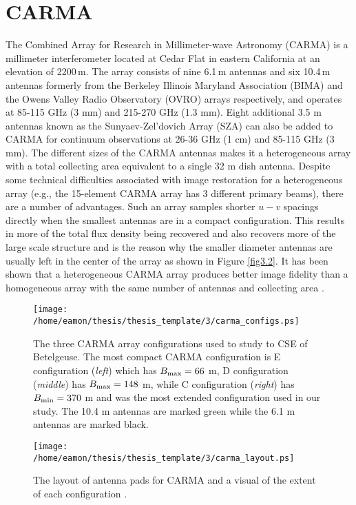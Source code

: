 \section{CARMA}\label{sec:3.2}

The Combined Array for Research in Millimeter-wave Astronomy (CARMA) \citep{bock_2006} is a millimeter interferometer located at Cedar Flat in eastern California at an elevation of 2200\,m. The array consists of nine 6.1\,m antennas and six 10.4\,m antennas formerly from the Berkeley Illinois Maryland Association (BIMA) and the Owens Valley Radio Observatory (OVRO) arrays respectively, and operates at 85-115 GHz (3 mm) and 215-270 GHz (1.3 mm). Eight additional 3.5 m antennas known as the Sunyaev-Zel'dovich Array (SZA) can also be added to CARMA for continuum observations at 26-36 GHz (1 cm) and 85-115 GHz (3 mm). The different sizes of the CARMA antennas makes it a heterogeneous array with a  total collecting area equivalent to a single 32 m dish antenna. Despite some technical difficulties associated with image restoration for a heterogeneous array (e.g., the 15-element CARMA array has 3 different primary beams), there are a number of advantages. Such an array samples shorter $u-v$ spacings directly when the smallest antennas are in a compact configuration. This results in more of the total flux density being recovered and also recovers more of the large scale structure and is the reason why the smaller diameter antennas are usually left in the center of the array as shown in Figure \ref{fig3.2}. It has been shown that a heterogeneous CARMA array produces better image fidelity than a homogeneous array with the same number of antennas and collecting area \citep{wright_1999}. 

\begin{figure}[!ht]
\centering 
\vspace{10mm}
          \texttt{[image: /home/eamon/thesis/thesis\_template/3/carma\_configs.ps]}
\caption[CARMA array configurations used]{The three CARMA array configurations used to study to CSE of Betelgeuse. The most compact CARMA configuration is E configuration (\textit{left}) which has $B_{\rm{max}}=66$ m, D configuration (\textit{middle}) has $B_{\rm{max}}=148$ m, while C configuration (\textit{right}) has $B_{\rm{min}}=370$ m and was the most extended configuration used in our study. The 10.4 m antennas are marked green while the 6.1 m antennas are marked black.}
\label{fig3.2}
\centering 
\vspace{10mm}
          \texttt{[image: /home/eamon/thesis/thesis\_template/3/carma\_layout.ps]}
\caption[Layout of antenna pads for CARMA]{The layout of antenna pads for CARMA and a visual of the extent of each configuration \citep{bock_2006}.}
\label{fig3.3}
\end{figure}

